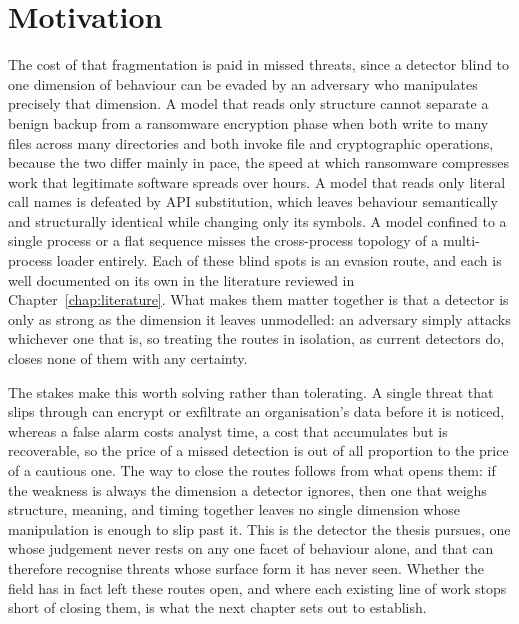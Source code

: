 \documentclass[%
    BCOR=10mm,
    DIV=13,
    toc=bibliography,
    toc=listof,
    oneside,
    12pt,
]{scrbook}
\begin{document}
\section{Motivation}
\label{sec:motivation}

The cost of that fragmentation is paid in missed threats, since a detector blind
to one dimension of behaviour can be evaded by an adversary who manipulates
precisely that dimension. A model that reads only structure cannot separate a
benign backup from a ransomware encryption phase when both write to many files
across many directories and both invoke file and cryptographic operations, because
the two differ mainly in pace, the speed at which ransomware compresses work that
legitimate software spreads over hours. A model that reads only literal call names
is defeated by API substitution, which leaves
behaviour semantically and structurally identical while changing only its symbols.
A model confined to a single process or a flat sequence misses the cross-process
topology of a multi-process loader entirely. Each of these blind spots is an
evasion route, and each is well documented on its own in the literature reviewed in
Chapter~\ref{chap:literature}. What makes them matter together is that a detector is
only as strong as the dimension it leaves unmodelled: an adversary simply attacks
whichever one that is, so treating the routes in isolation, as current detectors do,
closes none of them with any certainty.

The stakes make this worth solving rather than tolerating. A single threat that slips
through can encrypt or exfiltrate an organisation's data before it is noticed,
whereas a false alarm costs analyst time, a cost that accumulates but is
recoverable, so the
price of a missed detection is out of all proportion to the price of a cautious one.
The way to close the routes follows from what opens them: if the weakness is always
the dimension a detector ignores, then one that weighs structure, meaning, and timing
together leaves no single dimension whose manipulation is enough to slip past it.
This is the detector the thesis pursues, one whose judgement never rests on any one
facet of behaviour alone, and that can therefore recognise threats whose surface form
it has never seen. Whether the field has in fact left these routes open, and where
each existing line of work stops short of closing them, is what the next chapter sets
out to establish.

\end{document}

